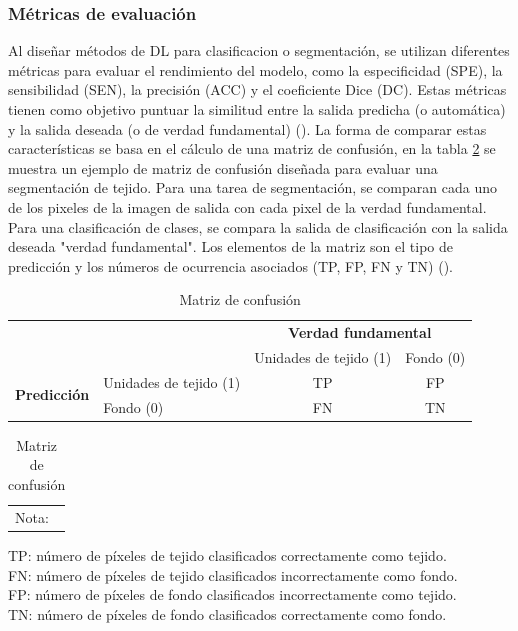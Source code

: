 \documentclass[11pt,a4paper,openany]{article}
\begin{document}
                
        \subsubsection{Métricas de evaluación}\label{sec:2.5.6}
        Al diseñar métodos de DL para clasificacion o segmentación, se utilizan diferentes métricas para evaluar el rendimiento del modelo, como la especificidad (SPE), la sensibilidad (SEN), la precisión (ACC) y el coeficiente Dice (DC). Estas métricas tienen como objetivo puntuar la similitud entre la salida predicha (o automática) y la salida deseada (o de verdad fundamental) (\cite{Hu2020}). La forma de comparar estas características se basa en el cálculo de una matriz de confusión, en la tabla \ref{tab:confusion_matrix} se muestra un ejemplo de matriz de confusión diseñada para evaluar una segmentación de tejido. Para una tarea de segmentación, se comparan cada uno de los pixeles de la imagen de salida con cada pixel de la verdad fundamental. Para una clasificación de clases, se compara la salida de clasificación con la salida deseada "verdad fundamental". Los elementos de la matriz son el tipo de predicción y los números de ocurrencia asociados (TP, FP, FN y TN) (\cite{Muller2022}). \\

        \begin{table}[H]
        \caption{Matriz de confusión}
            \label{tab:confusion_matrix}
            \centering
            \begin{tabular}{llcc}
            & & \multicolumn{2}{c}{\textbf{Verdad fundamental}} \\ \cline{3-4}
            & \multicolumn{1}{l|}{} & \multicolumn{1}{l|}{Unidades de tejido (1)} & \multicolumn{1}{l|}{Fondo (0)} \\ \cline{2-4}
            \multicolumn{1}{c|}{\multirow{2}{*}{\textbf{Predicción}}} & \multicolumn{1}{l|}{Unidades de tejido (1)} & \multicolumn{1}{c|}{TP} & \multicolumn{1}{c|}{FP} \\ \cline{2-4}
            \multicolumn{1}{c|}{} & \multicolumn{1}{l|}{Fondo (0)} & \multicolumn{1}{c|}{FN} & \multicolumn{1}{c|}{TN} \\ \cline{2-4}
            \end{tabular}\vspace{0.2cm}
            
            \begin{tabular}{l}
            \footnotesize{Nota:}
            \end{tabular}
            \begin{minipage}{11cm}
            \footnotesize{TP: número de píxeles de tejido clasificados correctamente como tejido.} \\
            \footnotesize{FN: número de píxeles de tejido clasificados incorrectamente como fondo.} \\
            \footnotesize{FP: número de píxeles de fondo clasificados incorrectamente como tejido.}\\
            \footnotesize{TN: número de píxeles de fondo clasificados correctamente como fondo.}
            \end{minipage}
        \end{table}
\end{document}
